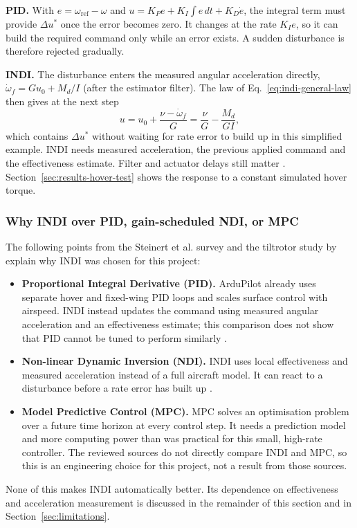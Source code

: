 \documentclass{article}
\begin{document}
\textbf{PID.} With $e=\omega_{\mathrm{ref}}-\omega$ and $u=K_Pe+K_I\int e\,dt+K_D\dot e$, the integral term must provide $\Delta u^\ast$ once the error becomes zero. It changes at the rate $K_I e$, so it can build the required command only while an error exists. A sudden disturbance is therefore rejected gradually.

\textbf{INDI.} The disturbance enters the measured angular acceleration directly, $\dot\omega_f=G u_0+M_d/I$ (after the estimator filter). The law of Eq.~\eqref{eq:indi-general-law} then gives at the next step
\begin{equation}
    u = u_0+\frac{\nu-\dot\omega_f}{G} = \frac{\nu}{G}-\frac{M_d}{G I},
\end{equation}
which contains $\Delta u^\ast$ without waiting for rate error to build up in this simplified example. INDI needs measured acceleration, the previous applied command and the effectiveness estimate. Filter and actuator delays still matter \citep{steinertPart2_2025}. Section~\ref{sec:results-hover-test} shows the response to a constant simulated hover torque.

\subsubsection{Why INDI over PID, gain-scheduled NDI, or MPC}
\label{sec:why-indi}
The following points from the Steinert et al. survey and the tiltrotor study by \citet{lombaerts2019} explain why INDI was chosen for this project:
\begin{itemize}
    \item \textbf{Proportional Integral Derivative (PID).} ArduPilot already uses separate hover and fixed-wing PID loops and scales surface control with airspeed. INDI instead updates the command using measured angular acceleration and an effectiveness estimate; this comparison does not show that PID cannot be tuned to perform similarly \citep{lombaerts2019}.
    \item \textbf{Non-linear Dynamic Inversion (NDI).} INDI uses local effectiveness and measured acceleration instead of a full aircraft model. It can react to a disturbance before a rate error has built up \citep{steinertPart2_2025}.
    \item \textbf{Model Predictive Control (MPC).} MPC solves an optimisation problem over a future time horizon at every control step. It needs a prediction model and more computing power than was practical for this small, high-rate controller. The reviewed sources do not directly compare INDI and MPC, so this is an engineering choice for this project, not a result from those sources.
\end{itemize}
None of this makes INDI automatically better. Its dependence on effectiveness and acceleration measurement is discussed in the remainder of this section and in Section~\ref{sec:limitations}.
\end{document}
